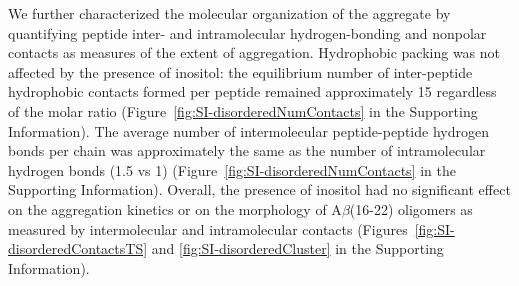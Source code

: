 We further characterized the molecular organization of the aggregate by quantifying peptide inter- and intramolecular hydrogen-bonding and nonpolar contacts as measures of the extent of aggregation.  Hydrophobic packing was not affected by the presence of inositol: the equilibrium number of inter-peptide hydrophobic contacts formed per peptide remained approximately 15 regardless of the molar ratio (Figure~\ref{fig:SI-disorderedNumContacts} in the Supporting Information). The average number of intermolecular peptide-peptide hydrogen bonds per chain was approximately the same as the number of intramolecular hydrogen bonds (1.5 vs 1) (Figure~\ref{fig:SI-disorderedNumContacts} in the Supporting Information). Overall, the presence of inositol had no significant effect on the aggregation kinetics or on the morphology of A$\beta$(16-22) oligomers as measured by intermolecular and intramolecular contacts (Figures~\ref{fig:SI-disorderedContactsTS} and \ref{fig:SI-disorderedCluster} in the Supporting Information).


